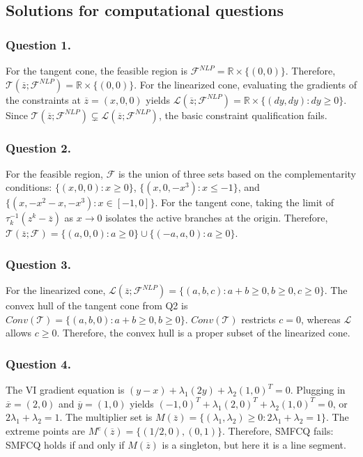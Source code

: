 \documentclass[pdflatex,sn-mathphys-num]{sn-jnl}%
\theoremstyle{definition}
\begin{document}
\subsection{Solutions for computational questions}
\subsubsection*{Question 1.}
For the tangent cone, the feasible region is $\mathcal{F}^{NLP} = \mathbb{R} \times \{(0,0)\}$. Therefore, $\mathcal{T}(\overline{z}; \mathcal{F}^{NLP}) = \mathbb{R} \times \{(0,0)\}$.
For the linearized cone, evaluating the gradients of the constraints at $\overline{z} = (x,0,0)$ yields $\mathcal{L}(\overline{z}; \mathcal{F}^{NLP}) = \mathbb{R} \times \{(dy, dy) : dy \ge 0\}$.
Since $\mathcal{T}(\overline{z}; \mathcal{F}^{NLP}) \subsetneq \mathcal{L}(\overline{z}; \mathcal{F}^{NLP})$, the basic constraint qualification fails.

\subsubsection*{Question 2.}
For the feasible region, $\mathcal{F}$ is the union of three sets based on the complementarity conditions: $\{(x,0,0) : x \ge 0\}$, $\{(x,0,-x^3) : x \le -1\}$, and $\{(x,-x^2-x,-x^3) : x \in [-1,0]\}$.
For the tangent cone, taking the limit of $\tau_k^{-1}(z^k - \overline{z})$ as $x \to 0$ isolates the active branches at the origin. Therefore, $\mathcal{T}(\overline{z}; \mathcal{F}) = \{(a,0,0) : a \ge 0\} \cup \{(-a,a,0) : a \ge 0\}$.

\subsubsection*{Question 3.}
For the linearized cone, $\mathcal{L}(\overline{z}; \mathcal{F}^{NLP}) = \{(a,b,c) : a+b \ge 0, b \ge 0, c \ge 0\}$.
The convex hull of the tangent cone from Q2 is $Conv(\mathcal{T}) = \{(a,b,0) : a+b \ge 0, b \ge 0\}$. $Conv(\mathcal{T})$ restricts $c=0$, whereas $\mathcal{L}$ allows $c \ge 0$. Therefore, the convex hull is a proper subset of the linearized cone.

\subsubsection*{Question 4.}
The VI gradient equation is $(y-x) + \lambda_1(2y) + \lambda_2(1,0)^T = 0$. Plugging in $\overline{x}=(2,0)$ and $\overline{y}=(1,0)$ yields $(-1,0)^T + \lambda_1(2,0)^T + \lambda_2(1,0)^T = 0$, or $2\lambda_1 + \lambda_2 = 1$.
The multiplier set is $M(\overline{z}) = \{(\lambda_1, \lambda_2) \ge 0 : 2\lambda_1 + \lambda_2 = 1\}$. 
The extreme points are $M^e(\overline{z}) = \{(1/2, 0), (0, 1)\}$.
Therefore, SMFCQ fails: SMFCQ holds if and only if $M(\overline{z})$ is a singleton, but here it is a line segment.
\end{document}
